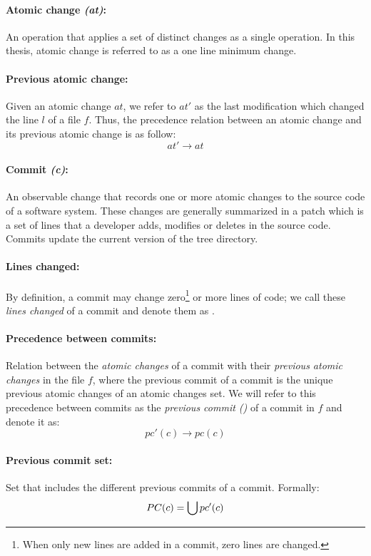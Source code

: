 \documentclass[a4paper, 12pt]{book}
\begin{document}
\paragraph{\textbf{Atomic change \emph{(at)}:}} An operation that applies a set of distinct changes as a single operation. In this thesis, atomic change is referred to as a one line minimum change.
\paragraph{\textbf{Previous atomic change:}} Given an atomic change $at$, we refer to $at'$ as the last modification which changed the line $l$ of a file $f$. Thus, the precedence relation between an atomic change and its previous atomic change is as follow:
\[ at' \rightarrow at\] 
\paragraph{\textbf{Commit \emph{(c)}:}} An observable change that records one or more atomic changes to the source code of a software system. These changes are generally summarized in a patch which is a set of lines that a developer adds, modifies or deletes in the source code. Commits update the current version of the tree directory.  
\paragraph{\textbf{Lines changed:}} By definition, a commit may change zero\footnote{When only new lines are added in a commit, zero lines are changed.} or more lines of code; we call these \emph{lines changed} of a commit and denote them as .
\paragraph{\textbf{Precedence between commits:}} Relation between the \emph{atomic changes} of a commit with their \emph{previous atomic changes} in the file $f$, where the previous commit of a commit is the unique previous atomic changes of an atomic changes set. We will refer to this precedence between commits as the \emph{previous commit (\pc)} of a commit in $f$ and denote it as:
\[ pc'(c) \rightarrow pc(c)\] 

\paragraph{\textbf{Previous commit set:}} Set that includes the different previous commits of a commit. Formally:%
\[ PC(c) =  \bigcup pc'(c)\]
\end{document}

